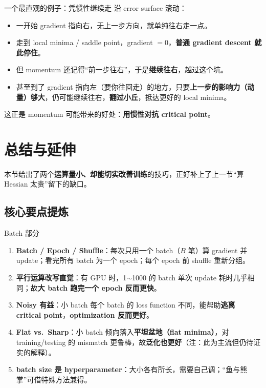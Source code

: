 \documentclass[a4paper]{article}
\begin{document}
\begin{knowledgebox}{一个最直观的例子：凭惯性继续走}
    沿 error surface 滚动：
    \begin{itemize}
        \item 一开始 gradient 指向右，无上一步方向，就单纯往右走一点。
        \item 走到 local minima / saddle point，gradient $=0$，\textbf{普通 gradient descent 就此停住}。
        \item 但 momentum 还记得``前一步往右''，于是\textbf{继续往右}，越过这个坑。
        \item 甚至到了 gradient 指向左（要你往回走）的地方，只要\textbf{上一步的影响力（动量）够大}，仍可能继续往右，\textbf{翻过小丘}，抵达更好的 local minima。
    \end{itemize}
    这正是 momentum 可能带来的好处：\textbf{用惯性对抗 critical point}。
\end{knowledgebox}

\section{总结与延伸}

本节给出了两个\textbf{运算量小、却能切实改善训练}的技巧，正好补上了上一节``算 Hessian 太贵''留下的缺口。

\subsection{核心要点提炼}

\begin{importantbox}{Batch 部分}
    \begin{enumerate}
        \item \textbf{Batch / Epoch / Shuffle}：每次只用一个 batch（$B$ 笔）算 gradient 并 update；看完所有 batch 为一个 epoch；每个 epoch 前 shuffle 重新分组。
        \item \textbf{平行运算改写直觉}：有 GPU 时，1$\sim$1000 的 batch 单次 update 耗时几乎相同；故\textbf{大 batch 跑完一个 epoch 反而更快}。
        \item \textbf{Noisy 有益}：小 batch 每个 batch 的 loss function 不同，能帮助\textbf{逃离 critical point}，\textbf{optimization 反而更好}。
        \item \textbf{Flat vs.\ Sharp}：小 batch 倾向落入\textbf{平坦盆地（flat minima）}，对 training/testing 的 mismatch 更鲁棒，故\textbf{泛化也更好}（注：此为主流但仍待证实的解释）。
        \item \textbf{batch size 是 hyperparameter}：大小各有所长，需要自己调；``鱼与熊掌''可借特殊方法兼得。
    \end{enumerate}
\end{importantbox}
\end{document}
